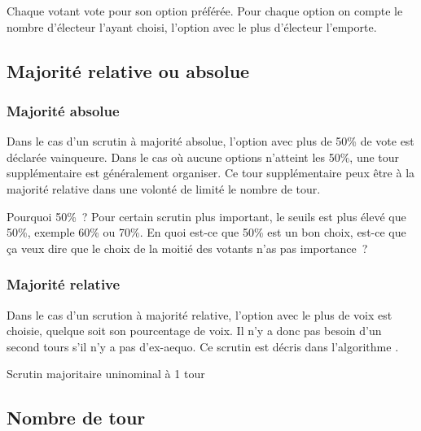 \documentclass[../report]{subfiles}
\begin{document}
  Chaque votant vote pour son option préférée.
  Pour chaque option on compte le nombre d'électeur l'ayant choisi, l'option avec le plus 
  d'électeur l'emporte.
  
  \subsection{Majorité relative ou absolue}
  \subsubsection{Majorité absolue}
  Dans le cas d'un scrutin à majorité absolue, l'option avec plus de 50\% de vote est déclarée
  vainqueure.
  Dans le cas où aucune options n'atteint les 50\%, une tour supplémentaire est généralement
  organiser.
  Ce tour supplémentaire peux être à la majorité relative dans une volonté de limité le nombre
  de tour.
  
  \begin{nota}{Pourquoi 50\%~?}
    Pour certain scrutin plus important, le seuils est plus élevé que 50\%, exemple 60\% ou 70\%. 
    En quoi est-ce que 50\% est un bon choix, est-ce que ça veux dire que le choix de la moitié
    des votants n'as pas importance~? 
  \end{nota}
  
  \subsubsection{Majorité relative}
  Dans le cas d'un scrution à majorité relative, l'option avec le plus de voix est choisie, 
  quelque soit son pourcentage de voix. Il n'y a donc pas besoin d'un second tours s'il n'y 
  a pas d'ex-aequo. Ce scrutin est décris dans l'algorithme .

  \begin{algorithm}
    \caption{Scrutin majoritaire uninominal à 1 tour}%
    \label{scrutin:maj-uni-1t}
    \begin{algorithmic}[1]
      \ENDFOR{}
    \end{algorithmic}
  \end{algorithm}


  \subsection{Nombre de tour}
\end{document}
